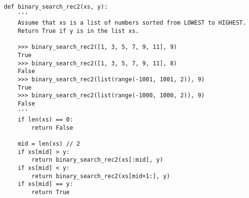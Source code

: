 \documentclass[10pt]{article}
\theoremstyle{definition}
\begin{document}
\filbreak
\begin{lstlisting}
def binary_search_rec2(xs, y):
    '''
    Assume that xs is a list of numbers sorted from LOWEST to HIGHEST.
    Return True if y is in the list xs.

    >>> binary_search_rec2([1, 3, 5, 7, 9, 11], 9)
    True
    >>> binary_search_rec2([1, 3, 5, 7, 9, 11], 8)
    False
    >>> binary_search_rec2(list(range(-1001, 1001, 2)), 9)
    True
    >>> binary_search_rec2(list(range(-1000, 1000, 2)), 9)
    False
    '''
    if len(xs) == 0:
        return False

    mid = len(xs) // 2
    if xs[mid] > y:
        return binary_search_rec2(xs[:mid], y)
    if xs[mid] < y:
        return binary_search_rec2(xs[mid+1:], y)
    if xs[mid] == y:
        return True
\end{lstlisting}
\end{document}
